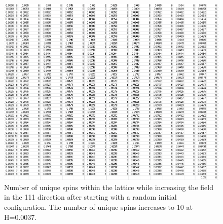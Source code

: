 \documentclass{article}
\begin{document}
\begin{figure}[ht]
\centering
  \includegraphics[keepaspectratio,scale=0.7]{111_3000/000to005RSpinChart.png}
  \caption{Number of unique spins within the lattice while increasing the field in the 111 direction after starting
  with a random initial configuration. The number of unique spins increases to 10 at H=0.0037.}
\end{figure}

\clearpage
\end{document}
